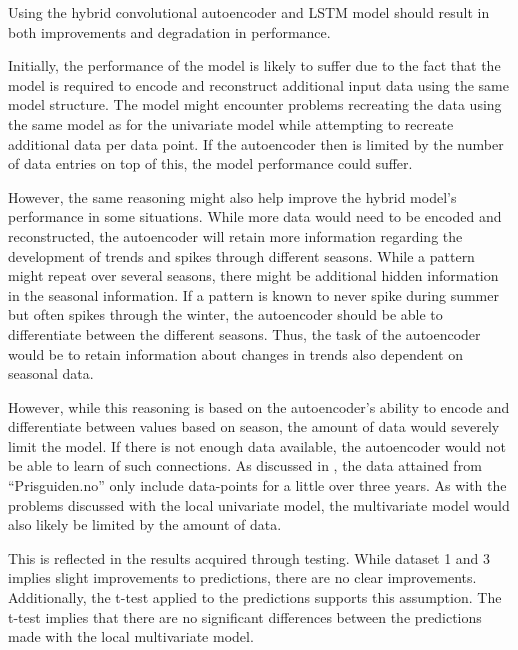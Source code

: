Using the hybrid convolutional autoencoder and LSTM model should result in both improvements and degradation in performance.

Initially, the performance of the model is likely to suffer due to the fact that
the model is required to encode and reconstruct additional input data using the same model structure.
The model might encounter problems recreating the data using the same model as for the univariate model
while attempting to recreate additional data per data point.
If the autoencoder then is limited by the number of data entries on top of this, the model performance could suffer.

However, the same reasoning might also help improve the hybrid model's performance in some situations.
While more data would need to be encoded and reconstructed, the autoencoder will retain more information
regarding the development of trends and spikes through different seasons.
% 
While a pattern might repeat over several seasons, there might be additional hidden information in the seasonal information.
If a pattern is known to never spike during summer but often spikes through the winter,
the autoencoder should be able to differentiate between the different seasons.
Thus, the task of the autoencoder would be to retain information about changes in trends also dependent on seasonal data.


However, while this reasoning is based on the autoencoder's ability to encode and differentiate between values based on season,
the amount of data would severely limit the model.
If there is not enough data available, the autoencoder would not be able to learn of such connections.
As discussed in , the data attained from ``Prisguiden.no'' only include data-points
for a little over three years.
As with the problems discussed with the local univariate model, the multivariate model would also likely be limited by the amount of data.

This is reflected in the results acquired through testing.
While dataset 1 and 3 implies slight improvements to predictions, there are no clear improvements.
Additionally, the t-test applied to the predictions supports this assumption.
The t-test implies that there are no significant differences between the predictions made with the local multivariate model.


